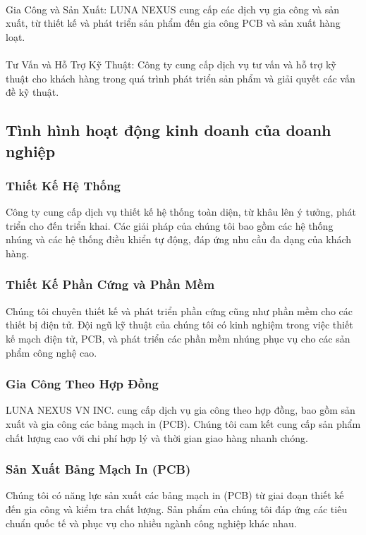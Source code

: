 \begin{flushleft}
		\paragraph{}
		\fontsize{16}{13}\selectfont Gia Công và Sản Xuất: LUNA NEXUS cung cấp các dịch vụ gia công và sản xuất, từ thiết kế và phát triển sản phẩm đến gia công PCB và sản xuất hàng loạt.\\
		\paragraph{}
		\fontsize{16}{13}\selectfont Tư Vấn và Hỗ Trợ Kỹ Thuật: Công ty cung cấp dịch vụ tư vấn và hỗ trợ kỹ thuật cho khách hàng trong quá trình phát triển sản phẩm và giải quyết các vấn đề kỹ thuật.\\
		\subsection{Tình hình hoạt động kinh doanh của doanh nghiệp}
		\subsubsection*{ Thiết Kế Hệ Thống}
		\fontsize{16}{13}\selectfont Công ty cung cấp dịch vụ thiết kế hệ thống toàn diện, từ khâu lên ý tưởng, phát triển cho đến triển khai. Các giải pháp của chúng tôi bao gồm các hệ thống nhúng và các hệ thống điều khiển tự động, đáp ứng nhu cầu đa dạng của khách hàng.

		\subsubsection*{ Thiết Kế Phần Cứng và Phần Mềm}
		\fontsize{16}{13}\selectfont Chúng tôi chuyên thiết kế và phát triển phần cứng cũng như phần mềm cho các thiết bị điện tử. Đội ngũ kỹ thuật của chúng tôi có kinh nghiệm trong việc thiết kế mạch điện tử, PCB, và phát triển các phần mềm nhúng phục vụ cho các sản phẩm công nghệ cao.

		\subsubsection*{ Gia Công Theo Hợp Đồng}
		\fontsize{16}{13}\selectfont LUNA NEXUS VN INC. cung cấp dịch vụ gia công theo hợp đồng, bao gồm sản xuất và gia công các bảng mạch in (PCB). Chúng tôi cam kết cung cấp sản phẩm chất lượng cao với chi phí hợp lý và thời gian giao hàng nhanh chóng.

		\subsubsection*{ Sản Xuất Bảng Mạch In (PCB)}
		\fontsize{16}{13}\selectfont Chúng tôi có năng lực sản xuất các bảng mạch in (PCB) từ giai đoạn thiết kế đến gia công và kiểm tra chất lượng. Sản phẩm của chúng tôi đáp ứng các tiêu chuẩn quốc tế và phục vụ cho nhiều ngành công nghiệp khác nhau.


\end{flushleft}
